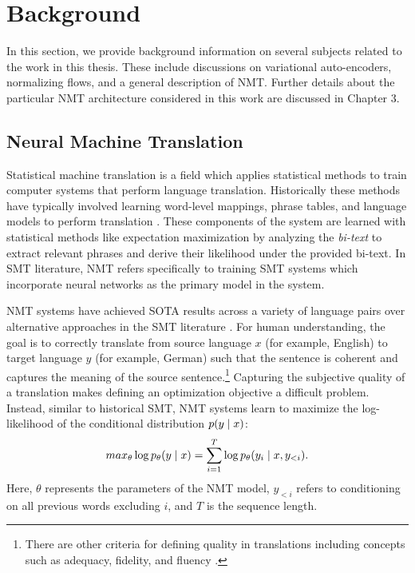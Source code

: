 \chapter{Background}
\label{ch:background}
In this section, we provide background information on several subjects related to the work in this thesis. These include discussions on variational auto-encoders, normalizing flows, and a general description of \ac{NMT}. Further details about the particular \ac{NMT} architecture considered in this work are discussed in Chapter 3. %



\section{Neural Machine Translation}
\label{section:neuralMT}

Statistical machine translation is a field which applies statistical methods to train computer systems that perform language translation. Historically these methods have typically involved learning word-level mappings, phrase tables, and language models to perform translation \cite{koehnSMT2010}. These components of the system are learned with statistical methods like expectation maximization by analyzing the \textit{bi-text} to extract relevant phrases and derive their likelihood under the provided bi-text.  In \ac{SMT} literature, \ac{NMT} refers specifically to training \ac{SMT} systems which incorporate neural networks as the primary model in the system. %

\ac{NMT} systems have achieved \ac{SOTA} results across a variety of language pairs over alternative approaches in the \ac{SMT} literature \cite{bahdanau2014NMTBYJoint,koehn2017NMT,vaswani2017attentionTransformer}. For human understanding, the goal is to correctly translate from source language $x$ (for example, English) to target language $y$ (for example, German) such that the sentence is coherent and captures the meaning of the source sentence.\footnote{There are other criteria for defining quality in translations including concepts such as adequacy, fidelity, and fluency \cite{Papineni2002BLEU,koehnSMT2010}.} Capturing the subjective quality of a translation makes defining an optimization  objective a difficult problem. Instead, similar to historical \ac{SMT}, \ac{NMT} systems learn to maximize the log-likelihood of the conditional distribution $p(y\; | \;{x})$: 
\begin{equation}
	max_{\theta} \log p_{\theta}(y \; | \;{x})  = \sum_{i=1}^{T} \log p_{\theta}(y_{i} \; | \;{x, y_{<i}}).
\end{equation}
Here, $\theta$ represents the parameters of the \ac{NMT} model, $y_{<i}$ refers to conditioning on all previous words excluding $i$, and $T$ is the sequence length. 

